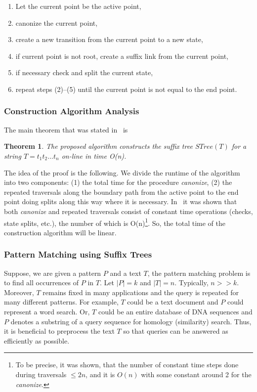 \documentclass[paper=a4, fontsize=11pt]{scrartcl} %
\numberwithin{equation}{section} %
\numberwithin{figure}{section} %
\numberwithin{table}{section} %
\newtheorem{theorem}{Theorem}[section]
\begin{document}
\begin{enumerate}
  \item Let the current point be the active point,
  \item canonize the current point,
  \item create a new transition from the current point to a new state,
  \item if current point is not root, create a suffix link from the current point,
  \item if necessary check and split the current state,
  \item repeat steps (2)--(5) until the current point is not equal to the end point.
\end{enumerate}

\subsubsection{Construction Algorithm Analysis}
\noindent The main theorem that was stated in~\cite{ukkonen1995line} is

\begin{theorem}
\label{theorem:suffix-tree-theorem}
The proposed algorithm constructs the suffix tree $STree(T)$ for a string $T = t_1 t_2 \dots t_n$ on-line in time O(n).
\end{theorem}

The idea of the proof is the following. We divide the runtime of the algorithm into two components: (1) the total time for the procedure \textit{canonize}, (2) the repeated traversals along the boundary path from the active point to the end point doing splits along this way where it is necessary. In~\cite{ukkonen1995line} it was shown that both \textit{canonize} and repeated traversals consist of constant time operations (checks, state splits, etc.), the number of which is O(n)\footnote{To be precise, it was shown, that the number of constant time steps done during traversals $\le 2n$, and it is $O(n)$ with some constant around 2 for the \textit{canonize}.}. So, the total time of the construction algorithm will be linear.

\subsubsection{Pattern Matching using Suffix Trees}
Suppose, we are given a pattern $P$ and a text $T$, the pattern matching problem is to find all occurrences of $P$ in $T$. Let $|P| = k$ and $|T| = n$. Typically, $n >> k$. Moreover, $T$ remains fixed in many applications and the query is repeated for many different patterns. For example, $T$ could be a text document and $P$ could represent a word search. Or, $T$ could be an entire database of DNA sequences and $P$ denotes a substring of a query sequence for homology (similarity) search. Thus, it is beneficial to preprocess the text $T$ so that queries can be answered as efficiently as possible.
\end{document}

